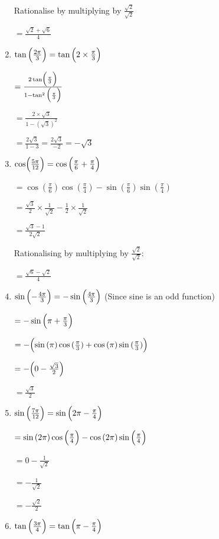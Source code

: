 \documentclass[../main.tex]{subfiles}
\begin{document}
\begin{enumerate}[itemsep=0.4cm]
    Rationalise by multiplying by $\frac{\sqrt{2}}{\sqrt{2}}$

    $=\frac{\sqrt{2}+\sqrt{6}}{4}$

    \item 
    $\tan{\Bigl(\frac{2\pi}{3}\Bigr)}=\tan{\Bigl(2\times \frac{\pi}{3}\Bigr)}$

    $=\frac{2\tan\Bigl(\frac{\pi}{3}\Bigr)}{1-\tan^2{\Bigl(\frac{\pi}{3}\Bigr)}}$

    $=\frac{2\times \sqrt{3}}{1-(\sqrt{3})^2}$

    $=\frac{2\sqrt{3}}{1-3}=\frac{2\sqrt{3}}{-2}=-\sqrt{3}$

    \item 
    $\cos\Bigl(\frac{5\pi}{12}\Bigr)=\cos{\Bigl(\frac{\pi}{6}+\frac{\pi}{4}\Bigr)}$

    $=\cos{(\frac{\pi}{6})}\cos{(\frac{\pi}{4})}-\sin{(\frac{\pi}{6})}\sin{(\frac{\pi}{4})}$

    $=\frac{\sqrt{3}}{2}\times \frac{1}{\sqrt{2}}-\frac{1}{2}\times \frac{1}{\sqrt{2}}$

    $=\frac{\sqrt{3}-1}{2\sqrt{2}}$

    Rationalising by multiplying by $\frac{\sqrt{2}}{\sqrt{2}}$:

    $=\frac{\sqrt{6}-\sqrt{2}}{4}$

    \item 
    $\sin{\Bigl(-\frac{4\pi}{3}\Bigr)}=-\sin{\Bigl(\frac{4\pi}{3}\Bigr)}$
    (Since sine is an odd function)

    $=-\sin{\Bigl(\pi + \frac{\pi}{3}\Bigr)}$

    $=-\Bigl(\sin{(\pi)}\cos{(\frac{\pi}{3})}+\cos{(\pi)}\sin{(\frac{\pi}{3})}\Bigr)$

    $=-\Bigl(0-\frac{\sqrt{3}}{2}\Bigr)$

    $=\frac{\sqrt{3}}{2}$

    \item 
    $\sin{\Bigl(\frac{7\pi}{12}\Bigr)}=\sin{\Bigl(2\pi-\frac{\pi}{4}\Bigr)}$

    $=\sin{(2\pi)}\cos{\Bigl(\frac{\pi}{4}\Bigr)}-\cos{(2\pi)}\sin{\Bigl(\frac{\pi}{4}\Bigr)}$

    $=0-\frac{1}{\sqrt{2}}$

    $=-\frac{1}{\sqrt{2}}$

    $=-\frac{\sqrt{2}}{2}$

    \item 
    $\tan{\Bigl(\frac{3\pi}{4}\Bigr)}=\tan{\Bigl(\pi-\frac{\pi}{4}\Bigr)}$


\end{enumerate}
\end{document}
